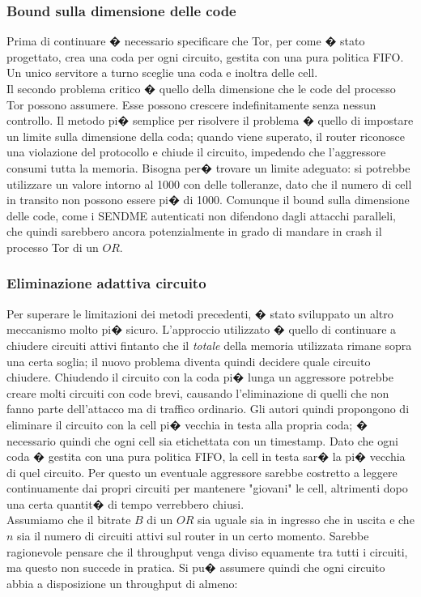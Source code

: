 \subsubsection{Bound sulla dimensione delle code}
Prima di continuare � necessario specificare che Tor, per come � stato progettato, crea una coda per ogni circuito, gestita con una pura politica FIFO. Un unico servitore a turno sceglie una coda e inoltra delle cell. \\
Il secondo problema critico � quello della dimensione che le code del processo Tor possono assumere. Esse possono crescere indefinitamente senza nessun controllo. Il metodo pi� semplice per risolvere il problema � quello di impostare un limite sulla dimensione della coda; quando viene superato, il router riconosce una violazione del protocollo e chiude il circuito, impedendo che l'aggressore consumi tutta la memoria. Bisogna per� trovare un limite adeguato: si potrebbe utilizzare un valore intorno al 1000 con delle tolleranze, dato che il numero di cell in transito non possono essere pi� di 1000. Comunque il bound sulla dimensione delle code, come i {\ttfamily SENDME} autenticati non difendono dagli attacchi paralleli, che quindi sarebbero ancora potenzialmente in grado di mandare in crash il processo Tor di un $OR$.

\subsubsection{Eliminazione adattiva circuito}
Per superare le limitazioni dei metodi precedenti, � stato sviluppato un altro meccanismo molto pi� sicuro. L'approccio utilizzato � quello di continuare a chiudere circuiti attivi fintanto che il \emph{totale} della memoria utilizzata rimane sopra una certa soglia; il nuovo problema diventa quindi decidere quale circuito chiudere. Chiudendo il circuito con la coda pi� lunga un aggressore potrebbe creare molti circuiti con code brevi, causando l'eliminazione di quelli che non fanno parte dell'attacco ma di traffico ordinario. Gli autori \cite{sniper} quindi propongono di eliminare il circuito con la cell pi� vecchia in testa alla propria coda; � necessario quindi che ogni cell sia etichettata con un timestamp. Dato che ogni coda � gestita con una pura politica FIFO, la cell in testa sar� la pi� vecchia di quel circuito. Per questo un eventuale aggressore sarebbe costretto a leggere continuamente dai propri circuiti per mantenere "giovani" le cell, altrimenti dopo una certa quantit� di tempo verrebbero chiusi. \\ Assumiamo che il bitrate $B$ di un $OR$ sia uguale sia in ingresso che in uscita e che $n$ sia il numero di circuiti attivi sul router in un certo momento. Sarebbe ragionevole pensare che il throughput venga diviso equamente tra tutti i circuiti, ma questo non succede in pratica. Si pu� assumere quindi che ogni circuito abbia a disposizione un throughput di almeno:

